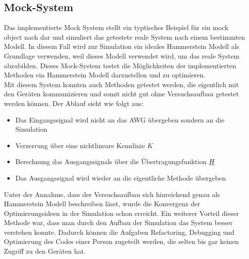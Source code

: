 \documentclass[../Report.tex]{subfiles}
\begin{document}
\subsection{Mock-System}
\label{subsec:code.mock}
Das implementierte Mock System stellt ein typtisches Beispiel für ein mock object nach \cite{mock} dar und simuliert das getestete reale System nach einem bestimmten Modell. In diesem Fall wird zur Simulation ein ideales Hammerstein Modell als Grundlage verwenden, weil dieses Modell verwendet wird, um das reale System abzubilden. Dieses Mock-System testet die Möglichkeiten der implementierten Methoden ein Hammerstein Modell darzustellen und zu optimieren.\\
Mit diesem System konnten auch Methoden getestet werden, die eigentlich mit den Geräten kommunizieren und somit nicht gut ohne Versuchsaufbau getestet werden können. Der Ablauf sieht wie folgt aus:
\begin{itemize}
	\item Das Eingangssignal wird nicht an das AWG übergeben sondern an die Simulation
	\item Verzerrung über eine nichtlineare Kennlinie $K$ 
	\item Berechnung das Ausgangssignals über die Übertragungsfunktion $\underline{H}$
	\item Das Ausgangssignal wird wieder an die eigentliche Methode übergeben
\end{itemize}
Unter der Annahme, dass der Versuchsaufbau sich hinreichend genau als Hammerstein Modell beschreiben lässt, wurde die Konvergenz der Optimierungsideen in der Simulation schon erreicht. Ein weiterer Vorteil dieser Methode war, dass man durch den Aufbau der Simulation das System besser verstehen konnte. Dadurch können die Aufgaben Refactoring, Debugging und Optimierung des Codes einer Person zugeteilt werden, die selten bis gar keinen Zugriff zu den Geräten hat.
\end{document}
